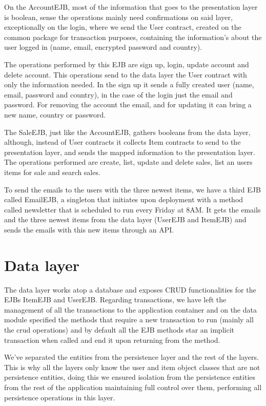 \documentclass{article}
\begin{document}
\qquad On the AccountEJB, most of the information that goes to the presentation layer is boolean, sense the operations mainly need confirmations on said layer, exceptionally on the login, where we send the User contract, created on the common package for transaction purposes, containing the information's about the user logged in (name, email, encrypted password and country).

\qquad The operations performed by this \ac{EJB} are sign up, login, update account and delete account. This operations send to the data layer the User contract with only the information needed. In the sign up it sends a fully created user (name, email, password and country), in the case of the login just the email and password. For removing the account the email, and for updating it can bring a new name, country or password.

\qquad The SaleEJB, just like the AccountEJB, gathers booleans from the data layer, although, instead of User contracts it collects Item contracts to send to the presentation layer, and sends the mapped information to the presentation layer. The operations performed are create, list, update and delete sales, list an users items for sale and search sales. 

\qquad To send the emails to the users with the three newest items, we have a third \ac{EJB} called EmailEJB, a singleton that initiates upon deployment with a method called newsletter that is scheduled to run every Friday at 8AM. It gets the emails and the three newest items from the data layer (UserEJB and ItemEJB) and sends the emails with this new items through an API. 




\section{Data layer}

\qquad The data layer works atop a database and exposes CRUD functionalities for the \ac{EJB}s ItemEJB and UserEJB. Regarding transactions, we have left the management of all the transactions to the application container and on the data module specified the methods that require a new transaction to run  (mainly all the crud operations) and by default all the \ac{EJB} methods star an implicit transaction when called and end it upon returning from the method.

\qquad We've separated the entities from the persistence layer and the rest of the layers. This is why all the layers only know the user and item object classes that are not persistence entities, doing this we ensured isolation from the persistence entities from the rest of the application maintaining full control over them, performing all persistence operations in this layer.
\end{document}
